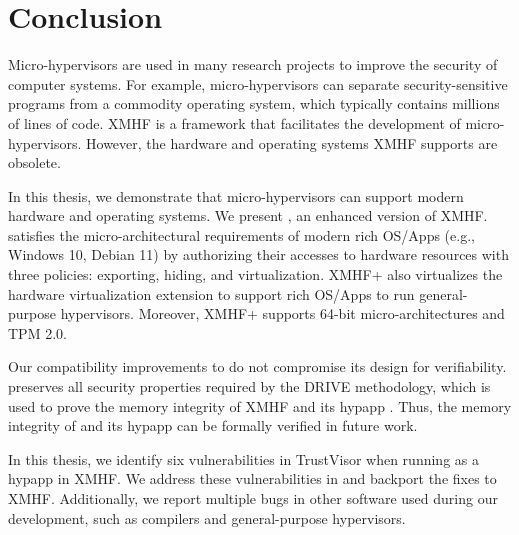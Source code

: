 \chapter{Conclusion}
\label{sec:conclusion}

Micro-hypervisors are used in many research projects to improve the security of computer systems. For example, micro-hypervisors can separate security-sensitive programs from a commodity operating system, which typically contains millions of lines of code. XMHF \cite{vasudevan2013design} is a framework that facilitates the development of micro-hypervisors. However, the hardware and operating systems XMHF supports are obsolete.

In this thesis, we demonstrate that micro-hypervisors can support modern hardware and operating systems. We present , an enhanced version of XMHF.  satisfies the micro-architectural requirements of modern rich OS/Apps (e.g., Windows 10, Debian 11) by authorizing their accesses to hardware resources with three policies: exporting, hiding, and virtualization. XMHF+ also virtualizes the hardware virtualization extension to support rich OS/Apps to run general-purpose hypervisors. Moreover, XMHF+ supports 64-bit micro-architectures and TPM 2.0. 

Our compatibility improvements to  do not compromise its design for verifiability.  preserves all security properties required by the \textsc{DRIVE} methodology, which is used to prove the memory integrity of XMHF and its hypapp \cite{vasudevan2013design}. Thus, the memory integrity of  and its hypapp can be formally verified in future work.

In this thesis, we identify six vulnerabilities in TrustVisor when running as a hypapp in XMHF. We address these vulnerabilities in  and backport the fixes to XMHF. Additionally, we report multiple bugs in other software used during our development, such as compilers and general-purpose hypervisors.

